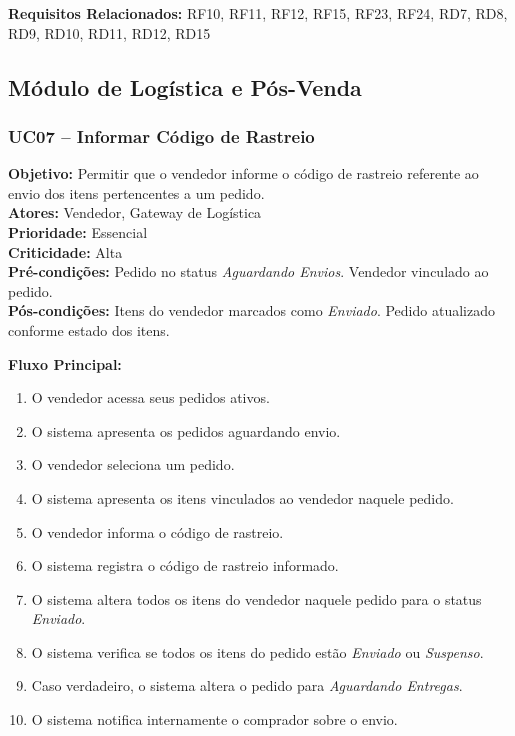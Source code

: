 ﻿\documentclass[12pt,a4paper]{article}
\begin{document}
\vspace{0.5em}
\noindent\textbf{Requisitos Relacionados:} RF10, RF11, RF12, RF15, RF23, RF24, RD7, RD8, RD9, RD10, RD11, RD12, RD15

\subsection{Módulo de Logística e Pós-Venda}

\subsubsection{UC07 – Informar Código de Rastreio}
\label{uc:05}
\noindent\textbf{Objetivo:} Permitir que o vendedor informe o código de rastreio referente ao envio dos itens pertencentes a um pedido.\\
\textbf{Atores:} Vendedor, Gateway de Logística\\
\textbf{Prioridade:} Essencial\\
\textbf{Criticidade:} Alta\\
\textbf{Pré-condições:} Pedido no status \textit{Aguardando Envios}. Vendedor vinculado ao pedido.\\
\textbf{Pós-condições:} Itens do vendedor marcados como \textit{Enviado}. Pedido atualizado conforme estado dos itens.

\vspace{0.5em}
\noindent\textbf{Fluxo Principal:}
\begin{enumerate}[label=\arabic*.]
    \item O vendedor acessa seus pedidos ativos.
    \item O sistema apresenta os pedidos aguardando envio.
    \item O vendedor seleciona um pedido.
    \item O sistema apresenta os itens vinculados ao vendedor naquele pedido.
    \item O vendedor informa o código de rastreio.
    \item O sistema registra o código de rastreio informado.
    \item O sistema altera todos os itens do vendedor naquele pedido para o status \textit{Enviado}.
    \item O sistema verifica se todos os itens do pedido estão \textit{Enviado} ou \textit{Suspenso}.
    \item Caso verdadeiro, o sistema altera o pedido para \textit{Aguardando Entregas}.
    \item O sistema notifica internamente o comprador sobre o envio.
\end{enumerate}
\end{document}

